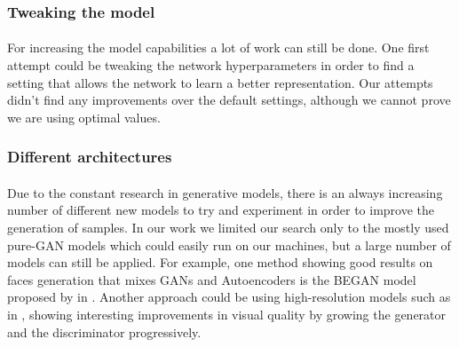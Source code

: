 \subsubsection{Tweaking the model}
\paragraph{} For increasing the model capabilities a lot of work can still be done. One first attempt could be tweaking the network hyperparameters in order to find a setting that allows the network to learn a better representation. Our attempts didn't find any improvements over the default settings, although we cannot prove we are using optimal values.

\subsubsection{Different architectures}
\paragraph{} Due to the constant research in generative models, there is an always increasing number of different new models to try and experiment in order to improve the generation of samples. In our work we limited our search only to the mostly used pure-GAN models which could easily run on our machines, but a large number of models can still be applied.
For example, one method showing good results on faces generation that mixes GANs and Autoencoders is the BEGAN model proposed by \citeauthor{gan:BEGAN} in \cite{gan:BEGAN}. Another approach could be using high-resolution models such as in \textit{} \cite{gan:high-res}, showing interesting improvements in visual quality by growing the generator and the discriminator progressively.


